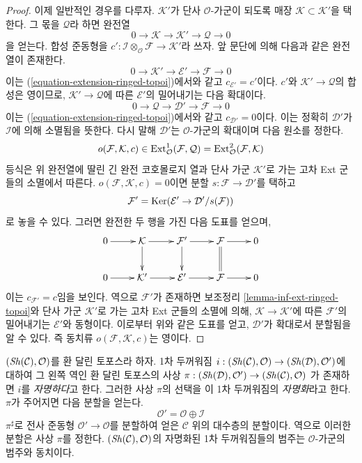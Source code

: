 \begin{proof}
\medskip\noindent
이제 일반적인 경우를 다루자. $\mathcal{K}'$가 단사
$\mathcal{O}$-가군이 되도록 매장 $\mathcal{K} \subset \mathcal{K}'$을
택한다. 그 몫을 $\mathcal{Q}$라 하면 완전열
$$
0 \to \mathcal{K} \to \mathcal{K}' \to \mathcal{Q} \to 0
$$
을 얻는다. 합성 준동형을
$c' : \mathcal{I} \otimes_\mathcal{O} \mathcal{F} \to \mathcal{K}'$라
쓰자. 앞 문단에 의해 다음과 같은 완전열이 존재한다.
$$
0 \to \mathcal{K}' \to \mathcal{E}' \to \mathcal{F} \to 0
$$
이는 (\ref{equation-extension-ringed-topoi})에서와 같고
$c_{\mathcal{E}'} = c'$이다. $c'$와 $\mathcal{K}' \to \mathcal{Q}$의
합성은 영이므로, $\mathcal{K}' \to \mathcal{Q}$에 따른
$\mathcal{E}'$의 밀어내기는 다음 확대이다.
$$
0 \to \mathcal{Q} \to \mathcal{D}' \to \mathcal{F} \to 0
$$
이는 (\ref{equation-extension-ringed-topoi})에서와 같고
$c_{\mathcal{D}'} = 0$이다. 이는 정확히 $\mathcal{D}'$가
$\mathcal{I}$에 의해 소멸됨을 뜻한다. 다시 말해 $\mathcal{D}'$는
$\mathcal{O}$-가군의 확대이며 다음 원소를 정한다.
$$
o(\mathcal{F}, \mathcal{K}, c) \in
\mathop{\mathrm{Ext}}\nolimits^1_\mathcal{O}(\mathcal{F}, \mathcal{Q}) =
\mathop{\mathrm{Ext}}\nolimits^2_\mathcal{O}(\mathcal{F}, \mathcal{K})
$$
등식은 위 완전열에 딸린 긴 완전 코호몰로지 열과 단사 가군
$\mathcal{K}'$로 가는 고차 Ext 군들의 소멸에서 따른다.
$o(\mathcal{F}, \mathcal{K}, c) = 0$이면 분할
$s : \mathcal{F} \to \mathcal{D}'$를 택하고
$$
\mathcal{F}' = \mathop{\mathrm{Ker}}(\mathcal{E}' \to \mathcal{D}'/s(\mathcal{F}))
$$
로 놓을 수 있다. 그러면 완전한 두 행을 가진 다음 도표를 얻으며,
$$
\xymatrix{
0 \ar[r] &
\mathcal{K} \ar[r] \ar[d] &
\mathcal{F}' \ar[r] \ar[d] &
\mathcal{F} \ar[r] \ar@{=}[d] &
0 \\
0 \ar[r] &
\mathcal{K}' \ar[r] &
\mathcal{E}' \ar[r] &
\mathcal{F} \ar[r] & 0
}
$$
이는 $c_{\mathcal{F}'} = c$임을 보인다. 역으로 $\mathcal{F}'$가
존재하면 보조정리 \ref{lemma-inf-ext-ringed-topoi}와 단사 가군
$\mathcal{K}'$로 가는 고차 Ext 군들의 소멸에 의해,
$\mathcal{K} \to \mathcal{K}'$에 따른 $\mathcal{F}'$의 밀어내기는
$\mathcal{E}'$와 동형이다. 이로부터 위와 같은 도표를 얻고,
$\mathcal{D}'$가 확대로서 분할됨을 알 수 있다. 즉 동치류
$o(\mathcal{F}, \mathcal{K}, c)$는 영이다.
\end{proof}

\begin{remark}
\label{remark-trivial-thickening-ringed-topoi}
$(\mathop{\mathit{Sh}}\nolimits(\mathcal{C}), \mathcal{O})$를 환 달린 토포스라 하자. 1차 두꺼워짐
$i : (\mathop{\mathit{Sh}}\nolimits(\mathcal{C}), \mathcal{O}) \to
(\mathop{\mathit{Sh}}\nolimits(\mathcal{D}), \mathcal{O}')$에 대하여 그 왼쪽 역인 환 달린 토포스의
사상
$\pi : (\mathop{\mathit{Sh}}\nolimits(\mathcal{D}), \mathcal{O}') \to (\mathop{\mathit{Sh}}\nolimits(\mathcal{C}), \mathcal{O})$
가 존재하면 $i$를 {\it 자명하다}고 한다. 그러한 사상 $\pi$의 선택을
이 1차 두꺼워짐의 {\it 자명화}라고 한다. $\pi$가 주어지면 다음 분할을
얻는다.
\begin{equation}
\label{equation-splitting-ringed-topoi}
\mathcal{O}' = \mathcal{O} \oplus \mathcal{I}
\end{equation}
$\pi^\sharp$로 전사 준동형 $\mathcal{O}' \to \mathcal{O}$를 분할하여
얻은 $\mathcal{C}$ 위의 대수층의 분할이다. 역으로 이러한 분할은 사상
$\pi$를 정한다. $(\mathop{\mathit{Sh}}\nolimits(\mathcal{C}), \mathcal{O})$의 자명화된 1차
두꺼워짐들의 범주는 $\mathcal{O}$-가군의 범주와 동치이다.
\end{remark}


